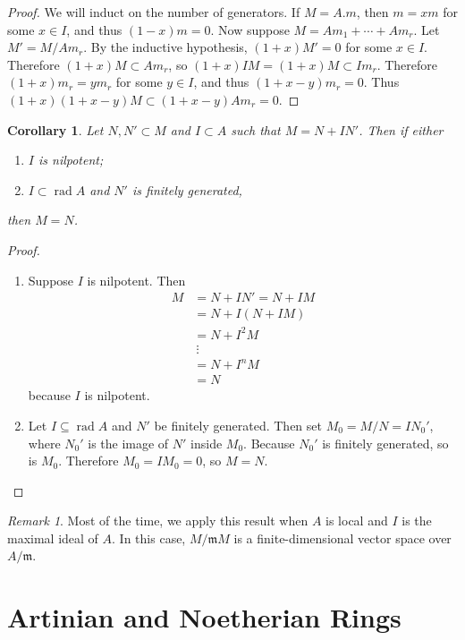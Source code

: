 \documentclass[leqno, openany]{memoir}
\newtheorem{cor}[thm]{Corollary}
\theoremstyle{definition}
\theoremstyle{remark}
\newtheorem{rmk}[thm]{Remark}
\theoremstyle{plain}
\theoremstyle{definition}
\theoremstyle{remark}
\newcommand{\mf}[1]{\mathfrak{#1}}
\begin{document}
\begin{proof} We will induct on the number of generators. If $M = A.m$, then $m
    = xm$ for some $x \in I$, and thus $(1-x)m = 0$. Now suppose $M = Am_1 +
    \cdots + Am_r$. Let $M' = M / Am_r$. By the inductive hypothesis, $(1+x)M'
    = 0$ for some $x \in I$.  Therefore $(1+x)M \subset A m_r$, so $(1+x) IM =
    (1+x)M \subset I m_r$. Therefore $(1+x) m_r = y m_r$ for some $y \in I$,
    and thus $(1+x - y) m_r = 0$. Thus $(1+x)(1+x-y) M \subset (1+x-y)A m_r =
    0$.  \end{proof}

\begin{cor} Let $N, N' \subset M$ and $I \subset A$ such that $M = N + I N'$.
Then if either \begin{enumerate} \item $I$ is nilpotent; \item $I \subset
\operatorname{rad} A$ and $N'$ is finitely generated, \end{enumerate} then $M =
N$.  \end{cor}

\begin{proof} \begin{enumerate} \item Suppose $I$ is nilpotent. Then
    \begin{align*} M &= N + IN' = N+IM \\ &= N + I (N + IM) \\ &= N + I^2 M \\
    &\ \vdots \\ &= N + I^n M \\ &= N \end{align*} because $I$ is nilpotent.
\item Let $I \subseteq \operatorname{rad} A$ and $N'$ be finitely generated.
    Then set $M_0 = M/N = I N_0'$, where $N_0'$ is the image of $N'$ inside
    $M_0$. Because $N_0'$ is finitely generated, so is $M_0$. Therefore $M_0 =
    I M_0 = 0$, so $M = N$.  \end{enumerate} \end{proof}

\begin{rmk} Most of the time, we apply this result when $A$ is local and $I$ is
the maximal ideal of $A$. In this case, $M / \mf{m} M$ is a finite-dimensional
vector space over $A / \mf{m}$.  \end{rmk}

\section{Artinian and Noetherian Rings}%
\label{sec:artinian_and_noetherian_rings}
\end{document}
